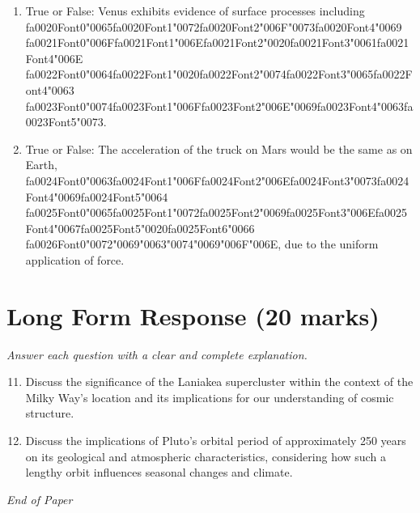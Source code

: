 \documentclass[12pt]{article}
\begin{document}
\begin{enumerate}[label=\arabic*.]
\item True or False: Venus exhibits evidence of surface processes including {\csname fa0020Font0\endcsname\char"0065}{\csname fa0020Font1\endcsname\char"0072}{\csname fa0020Font2\endcsname\char"006F}{\char"0073}{\csname fa0020Font4\endcsname\char"0069} {\csname fa0021Font0\endcsname\char"006F}{\csname fa0021Font1\endcsname\char"006E}{\csname fa0021Font2\endcsname\char"0020}{\csname fa0021Font3\endcsname\char"0061}{\csname fa0021Font4\endcsname\char"006E} {\csname fa0022Font0\endcsname\char"0064}{\csname fa0022Font1\endcsname\char"0020}{\csname fa0022Font2\endcsname\char"0074}{\csname fa0022Font3\endcsname\char"0065}{\csname fa0022Font4\endcsname\char"0063} {\csname fa0023Font0\endcsname\char"0074}{\csname fa0023Font1\endcsname\char"006F}{\csname fa0023Font2\endcsname\char"006E}{\char"0069}{\csname fa0023Font4\endcsname\char"0063}{\csname fa0023Font5\endcsname\char"0073}.
\item True or False: The acceleration of the truck on Mars would be the same as on Earth, {\csname fa0024Font0\endcsname\char"0063}{\csname fa0024Font1\endcsname\char"006F}{\csname fa0024Font2\endcsname\char"006E}{\csname fa0024Font3\endcsname\char"0073}{\csname fa0024Font4\endcsname\char"0069}{\csname fa0024Font5\endcsname\char"0064} {\csname fa0025Font0\endcsname\char"0065}{\csname fa0025Font1\endcsname\char"0072}{\csname fa0025Font2\endcsname\char"0069}{\csname fa0025Font3\endcsname\char"006E}{\csname fa0025Font4\endcsname\char"0067}{\csname fa0025Font5\endcsname\char"0020}{\csname fa0025Font6\endcsname\char"0066} {\csname fa0026Font0\endcsname\char"0072}{\char"0069}{\char"0063}{\char"0074}{\char"0069}{\char"006F}{\char"006E}, due to the uniform application of force.
\end{enumerate}

\section*{Long Form Response (20 marks)}
\textit{Answer each question with a clear and complete explanation.}
\begin{enumerate}[label=\arabic*.]
\setcounter{enumi}{10}
\item Discuss the significance of the Laniakea supercluster within the context of the Milky
Way's location and its implications for our understanding of cosmic structure.
\item Discuss the implications of Pluto's orbital period of approximately 250 years on its
geological and atmospheric characteristics, considering how such a lengthy orbit
influences seasonal changes and climate.
\end{enumerate}

\vfill
\noindent\textit{End of Paper}
\end{document}
